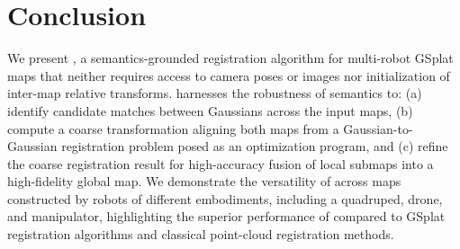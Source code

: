\section{Conclusion}
\label{sec:conclusion}
We present \algname, a semantics-grounded registration algorithm for multi-robot GSplat maps that neither requires access to camera poses or images nor initialization of inter-map relative transforms. \algname harnesses the robustness of semantics to: (a) identify candidate matches between Gaussians across the input maps, (b) compute a coarse transformation aligning both maps from a Gaussian-to-Gaussian registration problem posed as an optimization program, and (c) refine the coarse registration result for high-accuracy fusion of local submaps into a high-fidelity global map. We demonstrate the versatility of \algname across maps constructed by robots of different embodiments, including a quadruped, drone, and manipulator, highlighting the superior performance of \algname compared to GSplat registration algorithms and classical point-cloud registration methods.